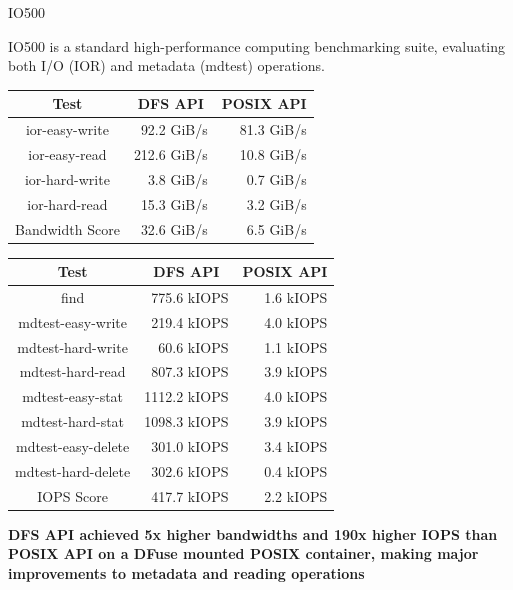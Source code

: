 \documentclass[final]{beamer}
\newlength{\colwidth}
\begin{document}
\begin{frame}[t, fragile]
\begin{columns}[t]
\begin{column}{\colwidth}
    \begin{block}{IO500}
      \par\medskip
    {IO500 is a standard high-performance computing benchmarking suite, evaluating both I/O (IOR) and metadata (mdtest) operations.}
     \par\medskip
    \renewcommand{\arraystretch}{1.4}
    \setlength{\tabcolsep}{15pt}
    \begin{minipage}[t]{0.48\colwidth}
      \centering
      {\small
      \begin{tabular}{|c|r|r|}
        \hline
        Test & \multicolumn{1}{c|}{DFS API} & \multicolumn{1}{c|}{POSIX API} \\
        \hline \hline
        ior-easy-write & 92.2 GiB/s & 81.3 GiB/s \\
        ior-easy-read & 212.6 GiB/s & 10.8 GiB/s \\
        ior-hard-write & 3.8 GiB/s & 0.7 GiB/s \\
        ior-hard-read & 15.3 GiB/s & 3.2 GiB/s \\
        \hline
        Bandwidth Score & 32.6 GiB/s & 6.5 GiB/s \\
        \hline
      \end{tabular}
      }
    \end{minipage}
    \hfill
    \begin{minipage}[t]{0.48\colwidth}
      \centering
      {\small 
      \begin{tabular}{|c|r|r|}
        \hline
        Test & \multicolumn{1}{c|}{DFS API} & \multicolumn{1}{c|}{POSIX API} \\
        \hline \hline
        find & 775.6 kIOPS & 1.6 kIOPS \\
        mdtest-easy-write & 219.4 kIOPS & 4.0 kIOPS \\
        mdtest-hard-write & 60.6 kIOPS & 1.1 kIOPS \\
        mdtest-hard-read & 807.3 kIOPS & 3.9 kIOPS \\
        mdtest-easy-stat & 1112.2 kIOPS & 4.0 kIOPS \\
        mdtest-hard-stat & 1098.3 kIOPS & 3.9 kIOPS \\
        mdtest-easy-delete & 301.0 kIOPS & 3.4 kIOPS \\
        mdtest-hard-delete & 302.6 kIOPS & 0.4 kIOPS \\
        \hline
        IOPS Score & 417.7 kIOPS  & 2.2 kIOPS \\
        \hline
      \end{tabular}
      }
    \end{minipage}
    \par\medskip
    {{\normalsize{\textbf{DFS API achieved \approx5x higher bandwidths and \approx190x higher IOPS than POSIX API on a DFuse mounted POSIX container, making major improvements to metadata and reading operations}}}}
    

\end{block}
\end{column}
\end{columns}
\end{frame}
\end{document}
